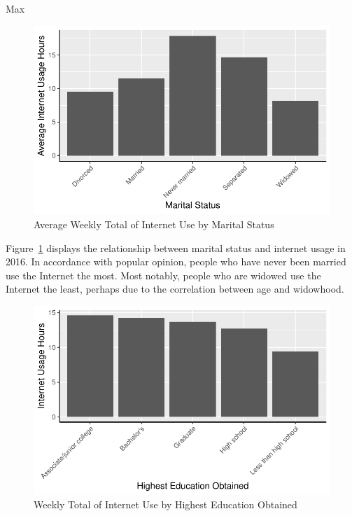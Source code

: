 \documentclass[
  letterpaper,
  DIV=11,
  numbers=noendperiod]{scrartcl}
\begin{document}
Max

\begin{figure}

{\centering \includegraphics{paper_files/figure-pdf/fig-maritalandinternet-1.pdf}

}

\caption{\label{fig-maritalandinternet}Average Weekly Total of Internet
Use by Marital Status}

\end{figure}

Figure~\ref{fig-maritalandinternet} displays the relationship between
marital status and internet usage in 2016. In accordance with popular
opinion, people who have never been married use the Internet the most.
Most notably, people who are widowed use the Internet the least, perhaps
due to the correlation between age and widowhood.

\begin{figure}

{\centering \includegraphics{paper_files/figure-pdf/fig-degreeandinternet-1.pdf}

}

\caption{\label{fig-degreeandinternet}Weekly Total of Internet Use by
Highest Education Obtained}

\end{figure}
\end{document}
